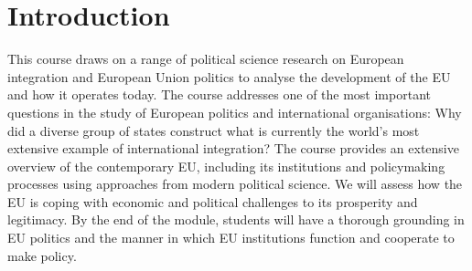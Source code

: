 
\section*{Introduction}

	This course draws on a range of political science research on European integration and European Union politics to analyse the development of the EU and how it operates today. The course addresses one of the most important questions in the study of European politics and international organisations: Why did a diverse group of states construct what is currently the world’s most extensive example of international integration? The course provides an extensive overview of the contemporary EU, including its institutions and policymaking processes using approaches from modern political science. We will assess how the EU is coping with economic and political challenges to its prosperity and legitimacy. By the end of the module, students will have a thorough grounding in EU politics and the manner in which EU institutions function and cooperate to make policy.
	